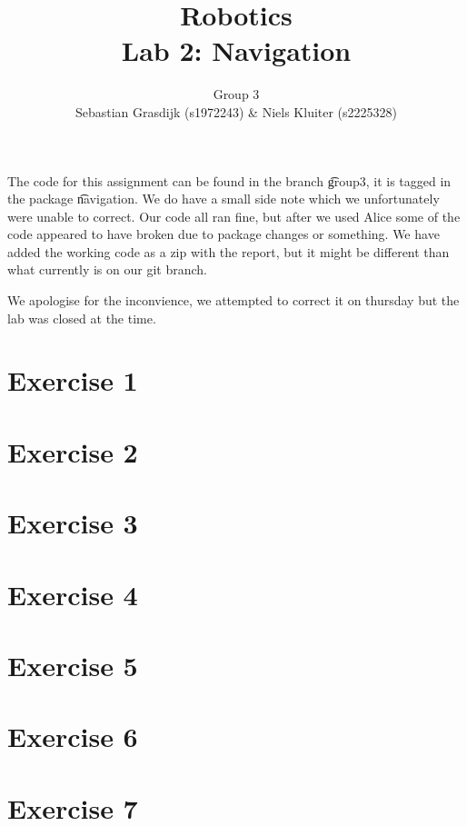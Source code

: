 \documentclass[a4paper]{article}
\title{Robotics\\ Lab 2: Navigation}
\author{Group 3\\Sebastian Grasdijk (s1972243) \& Niels Kluiter (s2225328)}
\begin{document}
\maketitle

\noindent The code for this assignment can be found in the branch \t{group3}, it is tagged in the package \t{navigation}. We do have a small side note which we unfortunately were unable to correct. Our code all ran fine, but after we used Alice some of the code appeared to have broken due to package changes or something. We have added the working code as a zip with the report, but it might be different than what currently is on our git branch.

We apologise for the inconvience, we attempted to correct it on thursday but the lab was closed at the time.

\section*{Exercise 1}


\section*{Exercise 2}


\section*{Exercise 3}


\section*{Exercise 4}


\section*{Exercise 5}


\section*{Exercise 6}


\section*{Exercise 7}


\printbibliography

\clearpage
\appendix

\end{document}
